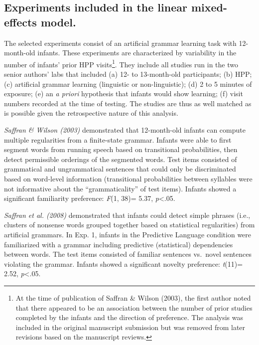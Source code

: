 \clearpage
\makeatletter
\efloat@restorefloats
\makeatother


\begin{appendix}
\section{}
\hypertarget{experiments-included-in-the-linear-mixed-effects-model.}{%
\subsection{Experiments included in the linear mixed-effects
model.}\label{experiments-included-in-the-linear-mixed-effects-model.}}

The selected experiments consist of an artificial grammar learning task
with 12-month-old infants. These experiments are characterized by
variability in the number of infants' prior HPP visits\footnote{At the
  time of publication of Saffran \& Wilson (2003), the first author
  noted that there appeared to be an association between the number of
  prior studies completed by the infants and the direction of
  preference. The analysis was included in the original manuscript
  submission but was removed from later revisions based on the
  manuscript reviews.}. They include all studies run in the two senior
authors' labs that included (a) 12- to 13-month-old participants; (b)
HPP; (c) artificial grammar learning (linguistic or non-linguistic); (d)
2 to 5 minutes of exposure; (e) an \emph{a priori} hypothesis that
infants would show learning; (f) visit numbers recorded at the time of
testing. The studies are thus as well matched as is possible given the
retrospective nature of this analysis.

\emph{Saffran \& Wilson (2003)} demonstrated that 12-month-old infants
can compute multiple regularities from a finite-state grammar. Infants
were able to first segment words from running speech based on
transitional probabilities, then detect permissible orderings of the
segmented words. Test items consisted of grammatical and ungrammatical
sentences that could only be discriminated based on word-level
information (transitional probabilities between syllables were not
informative about the ``grammaticality'' of test items). Infants showed
a significant familiarity preference: \emph{F}(1, 38)= 5.37,
\emph{p}\textless{}.05.

\emph{Saffran et al. (2008)} demonstrated that infants could detect
simple phrases (i.e., clusters of nonsense words grouped together based
on statistical regularities) from artificial grammars. In Exp. 1,
infants in the Predictive Language condition were familiarized with a
grammar including predictive (statistical) dependencies between words.
The test items consisted of familiar sentences vs.~novel sentences
violating the grammar. Infants showed a significant novelty preference:
\emph{t}(11)= 2.52, \emph{p}\textless{}.05.


\end{appendix}
